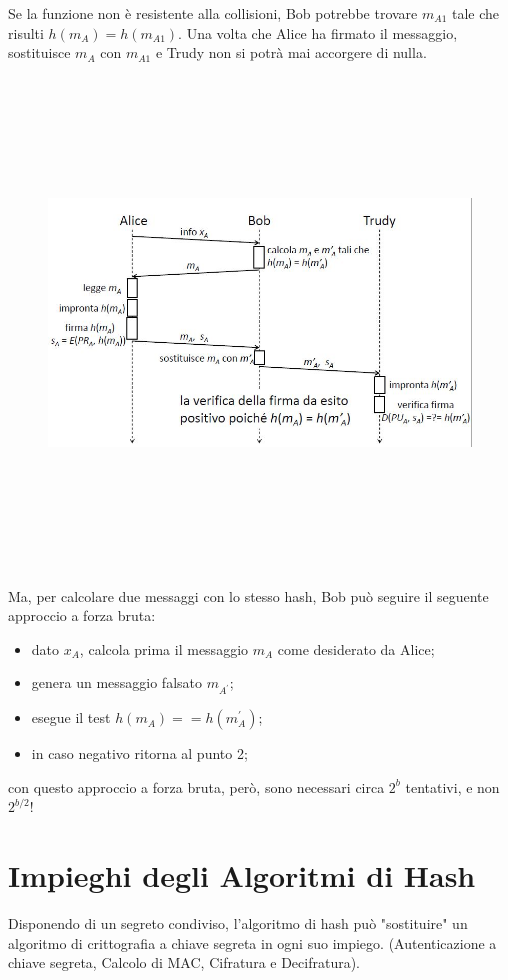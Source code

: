 Se la funzione non è resistente alla collisioni, Bob potrebbe trovare $m_{A1}$ tale che risulti $h(m_{A})= h(m_{A1})$.
Una volta che Alice ha firmato il messaggio, sostituisce $m_{A}$ con $m_{A1}$ e Trudy non si potrà mai accorgere di nulla.
\begin{figure}
	\begin{center}
	{\includegraphics[height=13cm, width=13cm, keepaspectratio]{Immagini/Capitolo4/schema_hash_collisioni_1.JPG}}
	\end{center}
\end{figure}
Ma, per calcolare due messaggi con lo stesso hash, Bob può seguire il seguente approccio a forza bruta:
\begin{itemize}
\item dato $x_{A}$, calcola prima il messaggio $m_{A}$ come desiderato da Alice;
\item genera un messaggio falsato $m_{A^{'}}$;
\item esegue il test $h(m_{A})==h(m_{A}^{'})$;
\item in caso negativo ritorna al punto 2;
\end{itemize}
con questo approccio a forza bruta, però, sono necessari circa $2^{b}$ tentativi, e non $2^{b/2}$!

\section{Impieghi degli Algoritmi di Hash}
Disponendo di un segreto condiviso, l'algoritmo di hash può "sostituire" un algoritmo di crittografia a chiave segreta in ogni suo impiego. (Autenticazione a chiave segreta, Calcolo di MAC, Cifratura e Decifratura).
